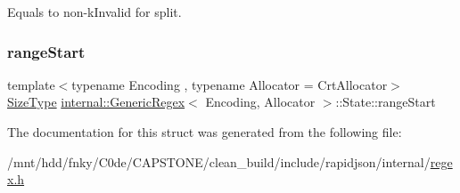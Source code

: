 Equals to non-\/k\+Invalid for split. 

\mbox{\label{structinternal_1_1GenericRegex_1_1State_a4f994da3eb09d3d86ad7dbfec4dd5c1c}} 
\subsubsection{\texorpdfstring{range\+Start}{rangeStart}}
{\footnotesize\ttfamily template$<$typename Encoding , typename Allocator  = Crt\+Allocator$>$ \\
\hyperlink{rapidjson_8h_a5ed6e6e67250fadbd041127e6386dcb5}{Size\+Type} \hyperlink{classinternal_1_1GenericRegex}{internal\+::\+Generic\+Regex}$<$ Encoding, Allocator $>$\+::State\+::range\+Start}



The documentation for this struct was generated from the following file\+:\begin{DoxyCompactItemize}
\item 
/mnt/hdd/fnky/\+C0de/\+C\+A\+P\+S\+T\+O\+N\+E/clean\+\_\+build/include/rapidjson/internal/\hyperlink{regex_8h}{regex.\+h}\end{DoxyCompactItemize}
